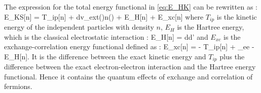 The expression for the total energy functional in \ref{eq:E_HK} can be rewritten as :
\be
	E_{KS}[n] = T_{ip}[n] + \int d\rr v_{ext}(\rr)n(\rr) + E_H[n] + E_{xc}[n]
\ee
where $T_{ip}$ is the kinetic energy of the independent particles with density $n$, $E_H$ is the Hartree energy, which is the classical electrostatic interaction :
\be
	E_H[n] = \int d\rr d\rr' 
	\label{eq:E_Hartree}
\ee
and $E_{xc}$ is the exchange-correlation energy functional defined as :
\be
	E_{xc}[n] = \langle {} \rangle - T_{ip}[n] + \langle {}_{ee} \rangle - E_H[n].
\ee
It is the difference between the exact kinetic energy and $T_{ip}$ plus the difference between the exact electron-electron interaction and the Hartree energy functional. Hence it contains the quantum effects of exchange and correlation of fermions.

